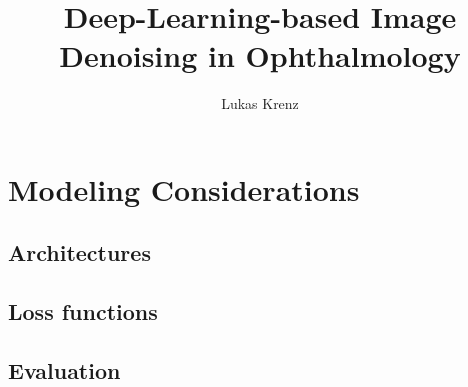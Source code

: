 \documentclass{scrartcl}
\begin{document}
\title{Deep-Learning-based Image Denoising in Ophthalmology}
\author{Lukas Krenz}

\maketitle

\section{Modeling Considerations}

\subsection{Architectures}
\label{sec:architecturs}

\subsection{Loss functions}
\label{sec:loss}

\subsection{Evaluation}
\label{sec:evaluation}


\printbibliography
\end{document}
